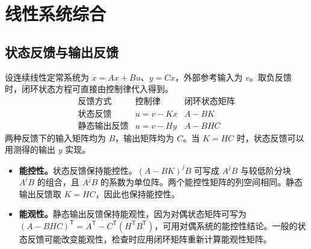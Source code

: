 \chapter{线性系统综合}
\label{chap:linear-system-synthesis}

\section{状态反馈与输出反馈}

设连续线性定常系统为 $\dot x=Ax+Bu$、$y=Cx$，外部参考输入为 $v$。取负反馈时，闭环状态方程可直接由控制律代入得到。
\[
\begin{array}{c|c|c}
    \text{反馈方式} & \text{控制律} & \text{闭环状态矩阵}\\
    \hline
    \text{状态反馈} & u=v-Kx & A-BK\\
    \text{静态输出反馈} & u=v-Hy & A-BHC
\end{array}
\]
两种反馈下的输入矩阵均为 $B$，输出矩阵均为 $C$。当 $K=HC$ 时，状态反馈可以用测得的输出 $y$ 实现。

\begin{itemize}
    \item \textbf{能控性。}状态反馈保持能控性。$(A-BK)^jB$ 可写成 $A^jB$ 与较低阶分块 $A^iB$ 的组合，且 $A^jB$ 的系数为单位阵。两个能控性矩阵的列空间相同。静态输出反馈取 $K=HC$，因此也保持能控性。
    \item \textbf{能观性。}静态输出反馈保持能观性，因为对偶状态矩阵可写为 $(A-BHC)^{\mathsf T}=A^{\mathsf T}-C^{\mathsf T}(H^{\mathsf T}B^{\mathsf T})$，可用对偶系统的能控性结论。一般的状态反馈可能改变能观性，检查时应用闭环矩阵重新计算能观性矩阵。
\end{itemize}




